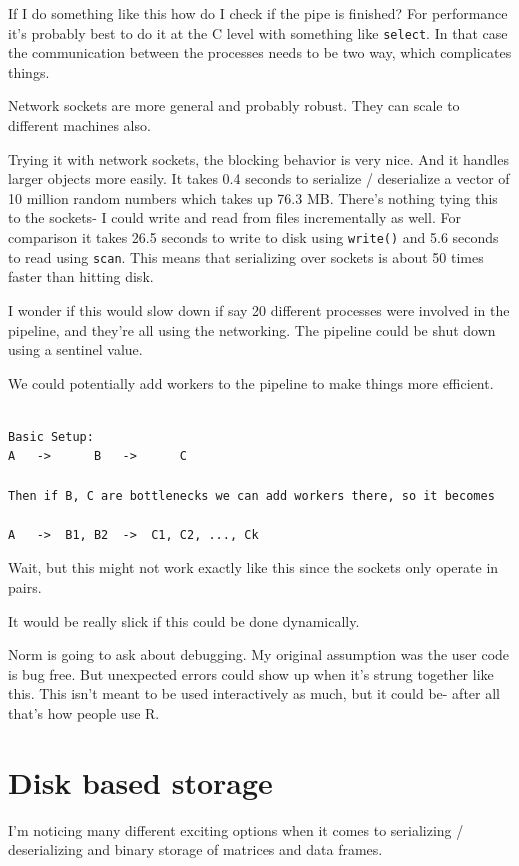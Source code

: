 \documentclass[12pt]{article}
\begin{document}
If I do something like this how do I check if the pipe is finished?
For performance it's probably best to do it at the C level with something
like \texttt{select}. In that case the communication between the processes
needs to be two way, which complicates things.

Network sockets are more general and probably robust. They can scale to
different machines also.

Trying it with network sockets, the blocking behavior is very nice. And it
handles larger objects more easily. It takes 0.4 seconds to serialize /
deserialize a vector of 10 million random numbers which takes up 76.3 MB.
There's nothing tying this to the sockets- I could write and read from
files incrementally as well.  For comparison it takes 26.5 seconds to write
to disk using \texttt{write()} and 5.6 seconds to read using \texttt{scan}.
This means that serializing over sockets is about 50 times faster than
hitting disk.

I wonder if this would slow down if say 20 different processes were
involved in the pipeline, and they're all using the networking.
The pipeline could be shut down using a sentinel value.

We could potentially add workers to the pipeline to make things more
efficient.
\begin{verbatim}

Basic Setup:
A   ->      B   ->      C

Then if B, C are bottlenecks we can add workers there, so it becomes

A   ->  B1, B2  ->  C1, C2, ..., Ck

\end{verbatim}

Wait, but this might not work exactly like this since the sockets only
operate in pairs.

It would be really slick if this could be done dynamically. 

Norm is going to ask about debugging. My original assumption was the user
code is bug free. But unexpected errors could show up when it's strung
together like this. This isn't meant to be used interactively as much, but
it could be- after all that's how people use R.

\section{Disk based storage}

I'm noticing many different exciting options when it comes to serializing /
deserializing and binary storage of matrices and data frames.
\end{document}
